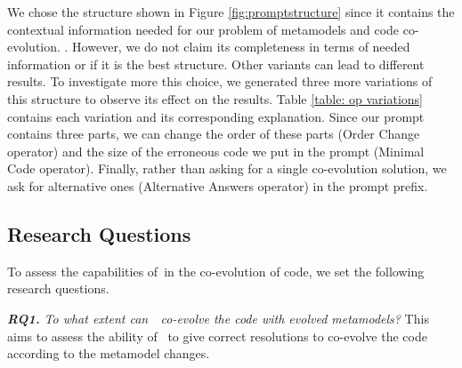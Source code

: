We chose the structure shown in Figure \ref{fig:promptstructure} since it contains the contextual information needed for our problem of metamodels and code co-evolution. . However, we do not claim its completeness in terms of needed information or if it is the best structure. Other variants can lead to different results. 
To investigate more this choice, we generated three more variations of this structure to observe its effect on the results. Table \ref{table: op variations} contains each variation and its corresponding explanation. Since our prompt contains three parts, we can change the order of these parts (Order Change operator) and the size of the erroneous code we put in the prompt (Minimal Code operator). Finally, rather than asking for a single co-evolution solution, we ask for alternative ones (Alternative Answers operator) in the prompt prefix. 


\subsection{Research Questions}

To assess the capabilities of~\LLM in the co-evolution of code, we set the following research questions. 

\textbf{\emph{RQ1.}} \emph{	To what extent can~\LLM~co-evolve the code with evolved metamodels? }
	This aims to assess the ability of \LLM~to give correct resolutions to co-evolve the code according to the metamodel changes.
	
